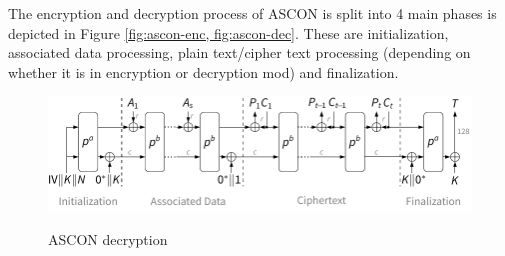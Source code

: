 The encryption and decryption process of ASCON is split into 4 main phases is depicted in Figure \ref{fig:ascon-enc, fig:ascon-dec}. These are initialization, associated data processing, plain text/cipher text processing (depending on whether it is in encryption or decryption mod) and finalization. 



\begin{figure}[H]
    \centering
    \caption{ASCON decryption}
    \includegraphics{images/fp/aead_decrypt.pdf}
    \label{fig:ascon-dec}
\end{figure}
